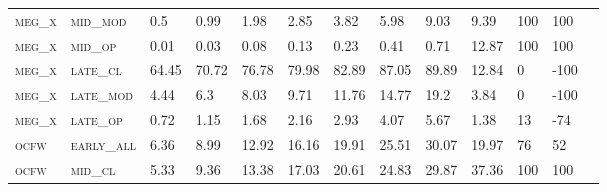 \begin{landscape}
\begin{table}[!htbp]
\begin{tabular}{@{}lllllllllllll@{}}
\footnotesize \textsc{meg\_x}      & \footnotesize \textsc{mid\_mod  }                & \footnotesize 0.5             & \footnotesize 0.99            & \footnotesize 1.98             & \footnotesize 2.85             & \footnotesize 3.82             & \footnotesize 5.98             & \footnotesize 9.03       & \footnotesize 9.39     & \footnotesize 100    & \footnotesize 100      \\
\footnotesize \textsc{meg\_x}      & \footnotesize \textsc{mid\_op   }                & \footnotesize 0.01            & \footnotesize 0.03            & \footnotesize 0.08             & \footnotesize 0.13             & \footnotesize 0.23             & \footnotesize 0.41             & \footnotesize 0.71       & \footnotesize 12.87    & \footnotesize 100    & \footnotesize 100      \\
\footnotesize \textsc{meg\_x}      & \footnotesize \textsc{late\_cl  }                & \footnotesize 64.45           & \footnotesize 70.72           & \footnotesize 76.78            & \footnotesize 79.98            & \footnotesize 82.89            & \footnotesize 87.05            & \footnotesize 89.89      & \footnotesize 12.84    & \footnotesize 0      & \footnotesize -100     \\
\footnotesize \textsc{meg\_x}      & \footnotesize \textsc{late\_mod }                & \footnotesize 4.44            & \footnotesize 6.3             & \footnotesize 8.03             & \footnotesize 9.71             & \footnotesize 11.76            & \footnotesize 14.77            & \footnotesize 19.2       & \footnotesize 3.84     & \footnotesize 0      & \footnotesize -100     \\
\footnotesize \textsc{meg\_x}      & \footnotesize \textsc{late\_op  }                & \footnotesize 0.72            & \footnotesize 1.15            & \footnotesize 1.68             & \footnotesize 2.16             & \footnotesize 2.93             & \footnotesize 4.07             & \footnotesize 5.67       & \footnotesize 1.38     & \footnotesize 13     & \footnotesize -74      \\
\footnotesize \textsc{ocfw}        & \footnotesize \textsc{early\_all}                & \footnotesize 6.36            & \footnotesize 8.99            & \footnotesize 12.92            & \footnotesize 16.16            & \footnotesize 19.91            & \footnotesize 25.51            & \footnotesize 30.07      & \footnotesize 19.97    & \footnotesize 76     & \footnotesize 52       \\
\footnotesize \textsc{ocfw}        & \footnotesize \textsc{mid\_cl   }                & \footnotesize 5.33            & \footnotesize 9.36            & \footnotesize 13.38            & \footnotesize 17.03            & \footnotesize 20.61            & \footnotesize 24.83            & \footnotesize 29.87      & \footnotesize 37.36    & \footnotesize 100    & \footnotesize 100      \\

\end{tabular}
\end{table}
\end{landscape}
